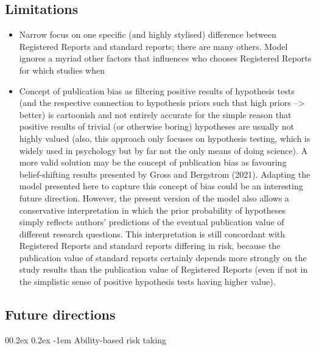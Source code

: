 \documentclass[british,,man,mask,floatsintext]{apa6}
\makeatletter
\renewcommand{\paragraph}{\@startsection{paragraph}{4}{\parindent}%
  {0\baselineskip \@plus 0.2ex \@minus 0.2ex}%
  {-1em}%
  {\normalfont\normalsize\bfseries\itshape\typesectitle}}
\makeatother
\begin{document}
\hypertarget{limitations}{%
\subsection{Limitations}\label{limitations}}

\begin{itemize}
\item
  Narrow focus on one specific (and highly stylised) difference between Registered Reports and standard reports; there are many others. Model ignores a myriad other factors that influences who chooses Registered Reports for which studies when
\item
  Concept of publication bias as filtering positive results of hypothesis tests (and the respective connection to hypothesis priors such that high priors --\textgreater{} better) is cartoonish and not entirely accurate for the simple reason that positive results of trivial (or otherwise boring) hypotheses are usually not highly valued (also, this approach only focuses on hypothesis testing, which is widely used in psychology but by far not the only means of doing science).
  A more valid solution may be the concept of publication bias as favouring belief-shifting results presented by Gross and Bergstrom (2021).
  Adapting the model presented here to capture this concept of bias could be an interesting future direction.
  However, the present version of the model also allows a conservative interpretation in which the prior probability of hypotheses simply reflects authors' predictions of the eventual publication value of different research questions.
  This interpretation is still concordant with Registered Reports and standard reports differing in risk, because the publication value of standard reports certainly depends more strongly on the study results than the publication value of Registered Reports (even if not in the simplistic sense of positive hypothesis tests having higher value).
\end{itemize}

\hypertarget{future-directions}{%
\subsection{Future directions}\label{future-directions}}

\hypertarget{ability-based-risk-taking}{%
\paragraph{Ability-based risk taking}\label{ability-based-risk-taking}}
\end{document}

